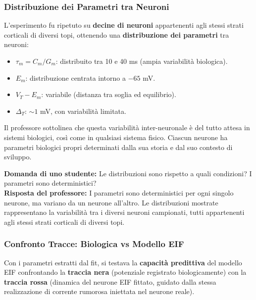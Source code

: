 \subsubsection{Distribuzione dei Parametri tra Neuroni}

L'esperimento fu ripetuto su \textbf{decine di neuroni} appartenenti agli stessi strati corticali di diversi topi, ottenendo una \textbf{distribuzione dei parametri} tra neuroni:

\begin{itemize}
    \item $\tau_m = C_m/G_m$: distribuito tra 10 e 40 ms (ampia variabilità biologica).
    \item $E_m$: distribuzione centrata intorno a $-65$ mV.
    \item $V_T - E_m$: variabile (distanza tra soglia ed equilibrio).
    \item $\Delta_T$: $\sim 1$ mV, con variabilità limitata.
\end{itemize}

Il professore sottolinea che questa variabilità inter-neuronale è del tutto attesa in sistemi biologici, così come in qualsiasi sistema fisico. Ciascun neurone ha parametri biologici propri determinati dalla sua storia e dal suo contesto di sviluppo.

\begin{tcolorbox}[colback=gray!5, colframe=gray!40, arc=2mm, boxrule=0.5pt]
\textbf{Domanda di uno studente:} Le distribuzioni sono rispetto a quali condizioni? I parametri sono deterministici?\\
\textbf{Risposta del professore:} I parametri sono deterministici per ogni singolo neurone, ma variano da un neurone all'altro. Le distribuzioni mostrate rappresentano la variabilità tra i diversi neuroni campionati, tutti appartenenti agli stessi strati corticali di diversi topi.
\end{tcolorbox}



\subsubsection{Confronto Tracce: Biologica vs Modello EIF}

Con i parametri estratti dal fit, si testava la \textbf{capacità predittiva} del modello EIF confrontando la \textbf{traccia nera} (potenziale registrato biologicamente) con la \textbf{traccia rossa} (dinamica del neurone EIF fittato, guidato dalla stessa realizzazione di corrente rumorosa iniettata nel neurone reale).

